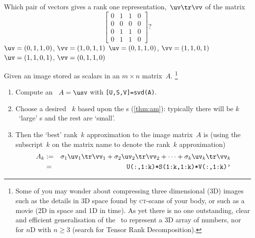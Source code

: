 \begin{example}
\begin{solution}
\begin{enumerate}
\end{enumerate}
\end{solution}
\end{example}




\begin{activity}
Which pair of vectors gives a rank one representation,~\(\uv\tr\vv\) of the matrix
\marginpar{}%
\begin{equation*}
\begin{bmatrix} 0&1&1&0 
\\0&0&0&0
\\0&1&1&0
\\0&1&1&0 \end{bmatrix}?
\end{equation*}
{\(\uv=(0,1,1,0)\), \(\vv=(1,0,1,1)\)}
{\(\uv=(0,1,1,0)\), \(\vv=(1,1,0,1)\)}
{\(\uv=(1,1,0,1)\), \(\vv=(0,1,1,0)\)}
\end{activity}





\begin{procedure} \label{pro:ai} 
Given an image stored as scalars in an \(m\times n\) matrix~\(A\).
\footnote{Some of you may wonder about compressing three dimensional (3D) images such as the details in 3D space found by \textsc{ct}-scans of your body, or such as a movie (2D in space  and 1D in time). 
As yet there is no one outstanding, clear and efficient generalisation of the \svd\ to represent a 3D array of numbers, nor for \(n\)D with \(n\geq3\) (search for Tensor Rank Decomposition).}
\begin{enumerate}
\item Compute an \svd\ \(A=\usv\) with \verb|[U,S,V]=svd(A)|.
\item Choose a desired ~\(k\) based upon the s (\autoref{thm:am}): typically there will be \(k\)~`large' s and the rest are `small'.
\item Then the `best' rank~\(k\) approximation to the image matrix~\(A\) is (using the subscript~\(k\) on the matrix name to denote the rank~\(k\) approximation)
\begin{eqnarray*}
A_k&:=&\sigma_1\uv_1\tr\vv_1+\sigma_2\uv_2\tr\vv_2+\cdots+\sigma_k\uv_k\tr\vv_k
\\&=&\verb|U(:,1:k)*S(1:k,1:k)*V(:,1:k)'|
\end{eqnarray*}
\end{enumerate}
\end{procedure}







